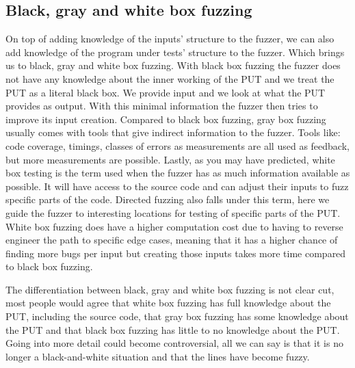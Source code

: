 \subsection{Black, gray and white box fuzzing}
\label{fuzzing:BlackGrayWhiteFuzzing}
On top of adding knowledge of the inputs' structure to the fuzzer, we can also add knowledge of the program under tests' structure to the fuzzer. Which brings us to black, gray and white box fuzzing. With black box fuzzing the fuzzer does not have any knowledge about the inner working of the PUT and we treat the PUT as a literal black box. We provide input and we look at what the PUT provides as output. With this minimal information the fuzzer then tries to improve its input creation. 
Compared to black box fuzzing, gray box fuzzing usually comes with tools that give indirect information to the fuzzer. Tools like: code coverage, timings, classes of errors as measurements are all used as feedback, but more measurements are possible. 
Lastly, as you may have predicted, white box testing is the term used when the fuzzer has as much information available as possible. It will have access to the source code and can adjust their inputs to fuzz specific parts of the code. Directed fuzzing also falls under this term, here we guide the fuzzer to interesting locations for testing of specific parts of the PUT. White box fuzzing does have a higher computation cost due to having to reverse engineer the path to specific edge cases, meaning that it has a higher chance of finding more bugs per input but creating those inputs takes more time compared to black box fuzzing. 

The differentiation between black, gray and white box fuzzing is not clear cut, most people would agree that white box fuzzing has full knowledge about the PUT, including the source code, that gray box fuzzing has some knowledge about the PUT and that black box fuzzing has little to no knowledge about the PUT. Going into more detail could become controversial, all we can say is that it is no longer a black-and-white situation and that the lines have become fuzzy.

